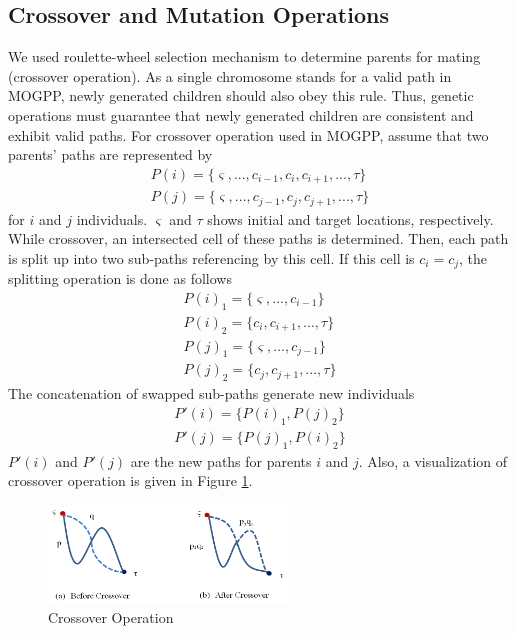 \documentclass[10pt,journal]{IEEEtran}
\begin{document}
\subsection{Crossover and Mutation Operations}
We used roulette-wheel selection mechanism to determine parents for mating (crossover  operation). As a single chromosome stands for a valid path in MOGPP, newly generated children should also obey this rule. Thus, genetic operations must guarantee that newly generated children are consistent and exhibit valid paths. For crossover operation used in MOGPP, assume that two parents' paths are represented by 
\begin{gather*}
P(i)=\lbrace \varsigma, ..., c_{i-1}, c_{i}, c_{i+1}, ..., \tau \rbrace \\
P(j)=\lbrace \varsigma, ..., c_{j-1}, c_{j}, c_{j+1}, ..., \tau \rbrace
\end{gather*}
for $i$ and $j$ individuals. $\varsigma$ and $\tau$ shows initial and target locations, respectively. While crossover, an intersected cell of these paths is determined. Then, each path is split up into two sub-paths referencing by this cell. If this cell is $c_{i} = c_{j}$, the splitting operation is done as follows
\begin{gather*}
P(i)_{1}=\lbrace \varsigma, ..., c_{i-1} \rbrace \\
P(i)_{2}=\lbrace c_{i}, c_{i+1}, ..., \tau \rbrace \\
P(j)_{1}=\lbrace \varsigma, ..., c_{j-1} \rbrace \\
P(j)_{2}=\lbrace c_{j}, c_{j+1}, ..., \tau \rbrace
\end{gather*}
The concatenation of swapped sub-paths generate new individuals
\begin{gather*}
P'(i)=\lbrace P(i)_{1}, P(j)_{2} \rbrace \\
P'(j)=\lbrace P(j)_{1}, P(i)_{2} \rbrace 
\end{gather*}
$P'(i)$ and $P'(j)$ are the new paths for parents $i$ and $j$. Also, a visualization  of crossover operation is given in Figure \ref{fig:xover}.

\begin{figure}
\centering
\includegraphics[width=2.5in]{mogpp/xover}
\caption{Crossover Operation}
\label{fig:xover}
\end{figure}
\end{document}
